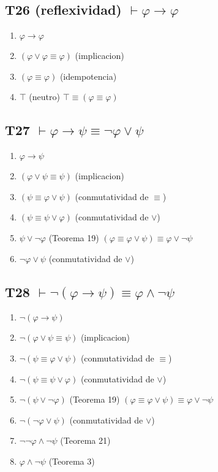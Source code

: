 \subsection{T26 (reflexividad) $\vdash \varphi \rightarrow \varphi $}

\begin{enumerate}
    \item $\varphi \rightarrow \varphi$
    \item $(\varphi \lor \varphi \equiv \varphi)$ \hfill (implicacion)
    \item $(\varphi \equiv \varphi)$ \hfill (idempotencia)
    \item $\top$ \hfill (neutro) $\top \equiv (\varphi \equiv \varphi)$
\end{enumerate}

\subsection{T27 $\vdash \varphi \rightarrow \psi \equiv \neg\varphi \lor \psi $}

\begin{enumerate}
    \item $\varphi \rightarrow \psi$
    \item $(\varphi \lor \psi \equiv \psi)$ \hfill (implicacion)
    \item $(\psi \equiv \varphi \lor \psi)$ \hfill (conmutatividad de $\equiv$)
    \item $(\psi \equiv \psi \lor \varphi)$ \hfill (conmutatividad de $\lor$)
    \item $\psi \lor \neg\varphi$ \hfill (Teorema 19) $(\varphi \equiv \varphi \lor \psi) \equiv \varphi \lor \neg\psi$
    \item $\neg\varphi \lor \psi$ \hfill (conmutatividad de $\lor$)
\end{enumerate}

\subsection{T28 $\vdash \neg(\varphi \rightarrow \psi) \equiv \varphi \land \neg\psi $}

\begin{enumerate}
    \item $\neg(\varphi \rightarrow \psi)$
    \item $\neg(\varphi \lor \psi \equiv \psi)$ \hfill (implicacion)
    \item $\neg(\psi \equiv \varphi \lor \psi)$ \hfill (conmutatividad de $\equiv$)
    \item $\neg(\psi \equiv \psi \lor \varphi)$ \hfill (conmutatividad de $\lor$)
    \item $\neg(\psi \lor \neg\varphi)$ \hfill (Teorema 19) $(\varphi \equiv \varphi \lor \psi) \equiv \varphi \lor \neg\psi$
    \item $\neg(\neg\varphi \lor \psi)$ \hfill (conmutatividad de $\lor$)
    \item $\neg\neg\varphi \land \neg\psi$ \hfill (Teorema 21)
    \item $\varphi \land \neg\psi$ \hfill (Teorema 3)
\end{enumerate}

